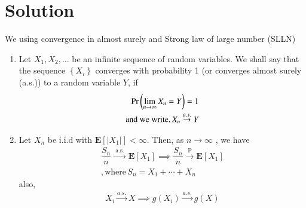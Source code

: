 \documentclass[journal,12pt,twocolumn]{IEEEtran}
\begin{document}
\section{Solution}
We using convergence in almost surely and Strong law of large number (SLLN)
\begin{enumerate}
\item Let $X_{1}, X_{2}, \ldots$ be an infinite sequence of random variables. We shall say that the sequence $\left\{X_{i}\right\}$ converges with probability 1 (or converges almost surely (a.s.)) to a random variable $Y$, if 
\begin{align}
\Pr\left(\lim _{n \rightarrow \infty} X_{n}=Y\right)=1 \\ 
\text{and we write}, X_{n} \stackrel{a . s .}{\rightarrow} Y
\end{align} 
\item Let $X_{n}$ be i.i.d with $\mathbf{E}\left[\left|X_{1}\right|\right]<\infty$. Then, as $n \rightarrow \infty$ , we have
\begin{align}
\dfrac{S_{n}}{n} \stackrel{\text { a.s. }}{\rightarrow} \mathbf{E}\left[X_{1}\right]\implies \dfrac{S_{n}}{n} \stackrel{\text { P }}{\rightarrow} \mathbf{E}\left[X_{1}\right]\\
,\text{where} \, S_n = X_1 + \cdots + X_n
\end{align}   
also,
\begin{align}
X_i \stackrel{a.s.}{\rightarrow} X \implies g(X_i) \stackrel{a.s.}{\rightarrow} g(X)
\label{Eq}  
\end{align}
\end{enumerate}
\end{document}
